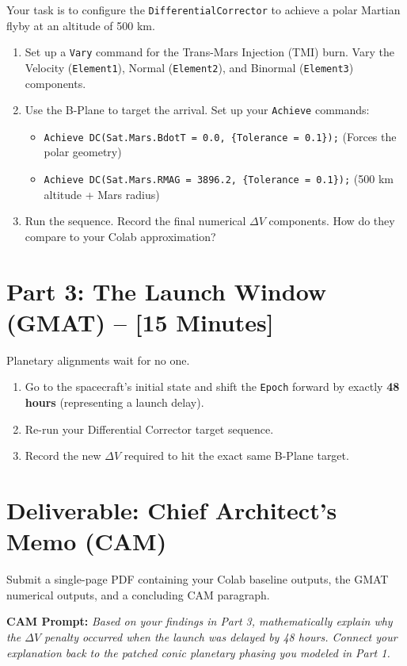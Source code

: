 \documentclass[11pt, letterpaper]{article}
\begin{document}
Your task is to configure the \texttt{DifferentialCorrector} to achieve a polar Martian flyby at an altitude of 500 km.
\begin{enumerate}
    \item Set up a \texttt{Vary} command for the Trans-Mars Injection (TMI) burn. Vary the Velocity (\texttt{Element1}), Normal (\texttt{Element2}), and Binormal (\texttt{Element3}) components.
    \item Use the B-Plane to target the arrival. Set up your \texttt{Achieve} commands:
    \begin{itemize}
        \item \texttt{Achieve DC(Sat.Mars.BdotT = 0.0, \{Tolerance = 0.1\});} (Forces the polar geometry)
        \item \texttt{Achieve DC(Sat.Mars.RMAG = 3896.2, \{Tolerance = 0.1\});} (500 km altitude + Mars radius)
    \end{itemize}
    \item Run the sequence. Record the final numerical $\Delta V$ components. How do they compare to your Colab approximation?
\end{enumerate}

\section*{Part 3: The Launch Window (GMAT) -- [15 Minutes]}
Planetary alignments wait for no one. 
\begin{enumerate}
    \item Go to the spacecraft's initial state and shift the \texttt{Epoch} forward by exactly \textbf{48 hours} (representing a launch delay).
    \item Re-run your Differential Corrector target sequence.
    \item Record the new $\Delta V$ required to hit the exact same B-Plane target. 
\end{enumerate}

\section*{Deliverable: Chief Architect's Memo (CAM)}
Submit a single-page PDF containing your Colab baseline outputs, the GMAT numerical outputs, and a concluding CAM paragraph. 

\textbf{CAM Prompt:} \textit{Based on your findings in Part 3, mathematically explain why the $\Delta V$ penalty occurred when the launch was delayed by 48 hours. Connect your explanation back to the patched conic planetary phasing you modeled in Part 1.}
\end{document}
